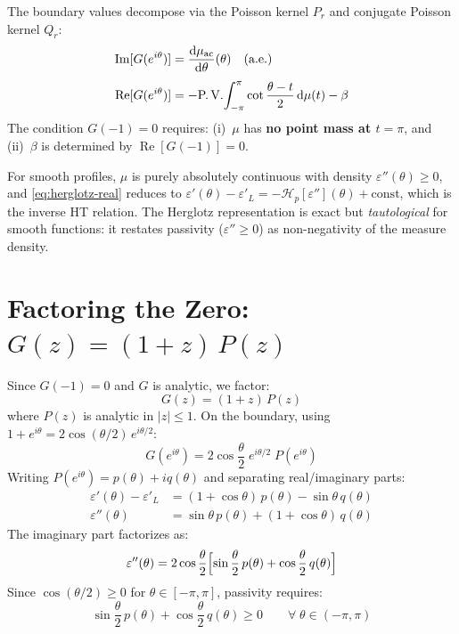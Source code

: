 \documentclass[11pt]{article}
\newcommand{\eps}{\varepsilon}
\newcommand{\Hp}{\mathcal{H}_p}
\newcommand{\PV}{\text{P.\,V.}}
\newcommand{\dd}{\mathrm{d}}
\begin{document}
The boundary values decompose via the Poisson kernel $P_r$ and conjugate Poisson kernel $Q_r$:
\begin{align}
\operatorname{Im}[G(e^{i\theta})] &= \frac{\dd\mu_{\text{ac}}}{\dd\theta}(\theta) \quad\text{(a.e.)} \label{eq:herglotz-imag}\\[4pt]
\operatorname{Re}[G(e^{i\theta})] &= -\PV\!\int_{-\pi}^{\pi}\cot\frac{\theta - t}{2}\,\dd\mu(t) - \beta \label{eq:herglotz-real}
\end{align}
The condition $G(-1) = 0$ requires: (i)~$\mu$ has \textbf{no point mass at $t = \pi$}, and (ii)~$\beta$ is determined by $\operatorname{Re}[G(-1)] = 0$.

For smooth profiles, $\mu$ is purely absolutely continuous with density $\eps''(\theta) \geq 0$, and \eqref{eq:herglotz-real} reduces to $\eps'(\theta) - \eps'_L = -\Hp[\eps''](\theta) + \text{const}$, which is the inverse HT relation.  The Herglotz representation is exact but \emph{tautological} for smooth functions: it restates passivity ($\eps'' \geq 0$) as non-negativity of the measure density.

\section{Factoring the Zero: $G(z) = (1+z)\,P(z)$}\label{sec:factoring}

Since $G(-1) = 0$ and $G$ is analytic, we factor:
\begin{equation}
G(z) = (1+z)\,P(z)
\end{equation}
where $P(z)$ is analytic in $|z| \leq 1$.  On the boundary, using $1 + e^{i\theta} = 2\cos(\theta/2)\,e^{i\theta/2}$:
\begin{equation}
G(e^{i\theta}) = 2\cos\frac{\theta}{2}\;e^{i\theta/2}\;P(e^{i\theta})
\end{equation}
Writing $P(e^{i\theta}) = p(\theta) + iq(\theta)$ and separating real/imaginary parts:
\begin{align}
\eps'(\theta) - \eps'_L &= (1+\cos\theta)\,p(\theta) - \sin\theta\,q(\theta) \label{eq:factor-real}\\
\eps''(\theta) &= \sin\theta\,p(\theta) + (1+\cos\theta)\,q(\theta) \label{eq:factor-imag}
\end{align}
The imaginary part factorizes as:
\begin{equation}
\eps''(\theta) = 2\cos\frac{\theta}{2}\Bigl[\sin\frac{\theta}{2}\,p(\theta) + \cos\frac{\theta}{2}\,q(\theta)\Bigr]
\end{equation}
Since $\cos(\theta/2) \geq 0$ for $\theta \in [-\pi,\pi]$, passivity requires:
\begin{equation}
\sin\frac{\theta}{2}\,p(\theta) + \cos\frac{\theta}{2}\,q(\theta) \geq 0 \qquad \forall\;\theta \in (-\pi,\pi)
\end{equation}
\end{document}
